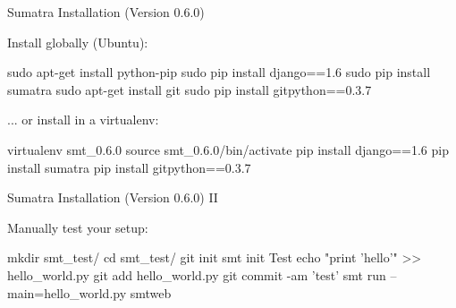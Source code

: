 \begin{frame}[fragile]{Sumatra Installation (Version 0.6.0)}

  \vspace{0.2cm}
  Install globally (Ubuntu):
  \vspace{0.15cm}
  \begin{mlineshell}
    sudo apt-get install python-pip
    sudo pip install django==1.6
    sudo pip install sumatra
    sudo apt-get install git
    sudo pip install gitpython==0.3.7
  \end{mlineshell}

  \vspace{0.35cm}

  ... or install in a virtualenv:
\vspace{0.15cm}
  \begin{mlineshell}
    virtualenv smt_0.6.0
    source smt_0.6.0/bin/activate
    pip install django==1.6
    pip install sumatra
    pip install gitpython==0.3.7
  \end{mlineshell}

\end{frame}


\begin{frame}[fragile]{Sumatra Installation (Version 0.6.0) II}

  \vspace{0.2cm}
  Manually test your setup:
  \vspace{0.1cm}
  \begin{mlineshell}
    mkdir smt_test/
    cd smt_test/
    git init
    smt init Test
    echo "print 'hello'" >> hello_world.py
    git add hello_world.py
    git commit -am 'test'
    smt run --main=hello_world.py
    smtweb
  \end{mlineshell}

\end{frame}
